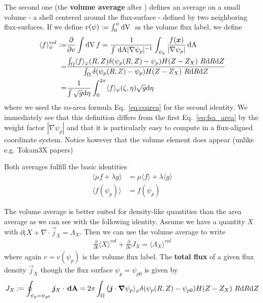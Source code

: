 The second one (the {\bf volume average} after \cite{haeseleer}) defines an average on a
small volume - a shell centered around the flux-surface - defined by two neighboring flux-surfaces.
If we define $v(\psi) := \int_0^\psi \mathrm{dV}\,$ as the volume
flux label, we define
\begin{align} \label{eq:fsa_vol}
\langle f \rangle^{vol}_\psi :=& \frac{\partial}{\partial v} \int \mathrm{dV}\, f
 = \frac{1}{\int \,\mathrm{dA} |\nabla\psi_p|^{-1} } \int_{\psi_p} \frac{f({\boldsymbol{x}})}{|\nabla\psi_p|} \,\mathrm{dA} \nonumber\\
=& \frac{\int_\Omega \langle f\rangle_\varphi(R,Z) \delta(\psi_p(R,Z)-\psi_{p})H(Z-Z_X)\ R \mathrm{d} R \mathrm{d} Z}
{\int_\Omega \delta(\psi_p(R,Z)-\psi_{p})H(Z-Z_X)\ R \mathrm{d} R \mathrm{d} Z}\nonumber\\
 =& \frac{1}{\int \sqrt{g}\mathrm{d}\eta } \int_0^{2\pi} \langle f\rangle_\varphi(\zeta,\eta) \sqrt{g}\mathrm{d}\eta
\end{align}
where we used the co-area formula Eq.~\eqref{eq:coarea} for the second
identity. We immediately see that this definition differs from the first
Eq.~\eqref{eq:fsa_area} by the weight factor $|\nabla\psi_p|$ and that it is particularly easy to compute
in a flux-aligned coordinate system. Notice however that the volume element does appear (unlike e.g. Tokam3X papers)

Both averages fulfill the basic identities
\begin{align}
\label{eq:fsa_identities}
\langle \mu f + \lambda g\rangle &= \mu\langle f\rangle + \lambda \langle g\rangle \\
\langle f(\psi_p) \rangle &= f(\psi_p)
\end{align}


The volume average is better suited for density-like quantities
than the area average as we can see with the following identity.
Assume we have a quantity $X$ with $\partial_t X + \nabla \cdot \vec j_X = \Lambda_X$. Then we can use the volume average to write
\begin{align}
\frac{\partial}{\partial t} \langle X \rangle^{vol} + \frac{\partial}{
  \partial v} J_X  = \langle \Lambda_X\rangle^{vol}
\label{eq:fsa_balance}
\end{align}
where again $v=v(\psi_p)$ is the volume flux label.
The {\bf total flux} of a given flux density $\vec j_X$ though the
flux surface $\psi_p = \psi_{p0}$ is given by
\begin{align}
J_X:=\oint_{\psi_p=\psi_{p0}} {\boldsymbol{j}}_X\cdot {\boldsymbol{\,\mathrm{dA}}} =
2\pi\int_\Omega {\boldsymbol{\langle}} {\boldsymbol{j}}\cdot {\boldsymbol{\nabla}}\psi_p\rangle_\varphi \delta(\psi_p(R,Z)-\psi_{p0}) H(Z-Z_X)\ R \mathrm{d} R \mathrm{d} Z
\label{eq:total_flux}
\end{align}
